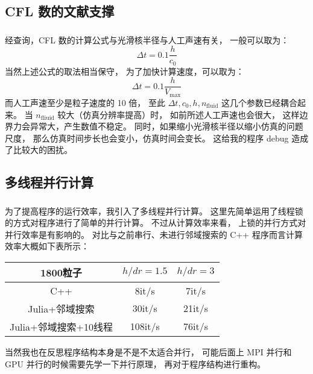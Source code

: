 \subsection{CFL 数的文献支撑}

\begin{frame}
    \frametitle{\subsecname}
    经查询，CFL 数的计算公式与光滑核半径与人工声速有关，
    一般可以取为：
    \begin{equation}
        \Delta t = 0.1\frac{h}{c_0}
    \end{equation}
    当然上述公式的取法相当保守，
    为了加快计算速度，可以取为：
    \begin{equation}
        \Delta t = 0.1\frac{h}{V_{\max}}
    \end{equation}
    而人工声速至少是粒子速度的 10 倍，
    至此 $\Delta t,c_0,h,n_{\text{fluid}}$ 这几个参数已经耦合起来。
    当 $n_\text{fliuid}$ 较大（仿真分辨率提高）时，
    如前所述人工声速也会很大，
    这样边界力会异常大，产生数值不稳定。
    同时，如果缩小光滑核半径以缩小仿真的问题尺度，
    那么仿真时间步长也会变小，仿真时间会变长。
    这给我的程序 debug 造成了比较大的困扰。
\end{frame}

\subsection{多线程并行计算}

\begin{frame}
    \frametitle{\subsecname}
    为了提高程序的运行效率，我引入了多线程并行计算。
    这里先简单运用了线程锁的方式对程序进行了简单的并行计算。
    不过从计算效率来看，
    上锁的并行方式对并行效率是有影响的。
    对比与之前串行、未进行邻域搜索的 C++ 程序而言计算效率大概如下表所示：
    \begin{table}[H]
        \centering
        \begin{tabular}{c|c|c}
            \hline
            1800粒子 & $h/dr=1.5$ & $h/dr=3$ \\
            \hline
            C++ & 8it/s & 7it/s \\
            Julia+邻域搜索 & 30it/s & 21it/s \\
            Julia+邻域搜索+10线程 & 108it/s & 76it/s \\
            \hline
        \end{tabular}
    \end{table}
    当然我也在反思程序结构本身是不是不太适合并行，
    可能后面上 MPI 并行和 GPU 并行的时候需要先学一下并行原理，
    再对于程序结构进行重构。
\end{frame}

